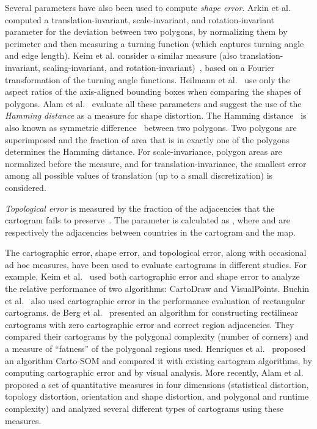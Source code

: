 \documentclass{egpubl}
\begin{document}
Several parameters have also been used to compute \textit{shape error}. Arkin et al.~\cite{ACH91} computed a translation-invariant, scale-invariant, and rotation-invariant parameter for the deviation between two polygons, by normalizing them
 by perimeter and then measuring a turning function (which captures turning angle and edge length). 
Keim et al. consider a similar measure (also translation-invariant, scaling-invariant, and
 rotation-invariant)~\cite{KNPS03}, based on a Fourier transformation of the turning angle functions.
Heilmann et al.~\cite{hkps04} use only the aspect ratios of the axis-aligned bounding boxes
 when comparing the shapes of polygons. Alam et al.~\cite{AKV15} evaluate all these parameters and suggest the use of the \textit{Hamming distance} as a measure for shape distortion. The Hamming distance~\cite{SKI98} is also known as symmetric difference~\cite{MRS10} between two polygons. Two polygons are superimposed and the fraction of area that is in exactly one of the polygons determines the Hamming distance.
 For scale-invariance, polygon areas are normalized before the measure, and for translation-invariance, the smallest error among all possible values of translation (up to a small discretization) is considered.
 
\textit{Topological error} is measured by the fraction of the adjacencies that the cartogram fails to preserve~\cite{hkps04}. The parameter is calculated as , where  and  are respectively the adjacencies between countries in the cartogram and the map.

The cartographic error, shape error, and topological error, along with occasional ad hoc measures, have been used to evaluate cartograms in different studies.
 For example, Keim et al.~\cite{KNPS03} used both cartographic error and shape error to analyze the relative performance of two algorithms: CartoDraw and VisualPoints. Buchin et al.~\cite{BSV12} also used cartographic error in the performance evaluation of rectangular cartograms.  de Berg et al.~\cite{BMS10} presented an algorithm for constructing rectilinear cartograms with zero cartographic error and correct region adjacencies. They compared their cartograms by the polygonal complexity (number of corners) and a measure of ``fatness'' of the polygonal regions used. Henriques et al.~\cite{Carto_SOM} proposed an algorithm Carto-SOM and compared it with  existing cartogram algorithms, by computing cartographic error and by visual analysis. More recently, Alam et al.~\cite{AKV15} proposed a set of quantitative measures in four dimensions (statistical distortion, topology distortion, orientation and shape distortion, and polygonal and runtime complexity) and analyzed several different types of cartograms using these measures.
\end{document}

